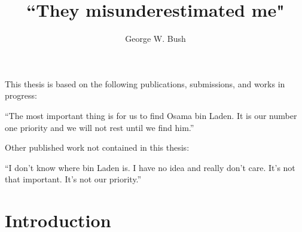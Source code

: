 \documentclass[12pt,twoside]{UoMthesis}
\title{``They misunderestimated me"}
\author{George W. Bush}
\begin{document}
\preface

This thesis is based on the following publications, submissions, and works in progress:
\begin{list}{}{}
\item ``The most important thing is for us to find Osama bin Laden. It is our number one priority and we will not rest until we find him.''
\end{list}

\noindent
Other published work not contained in this thesis:
\begin{list}{}{}
\item ``I don't know where bin Laden is. I have no idea and really don't care. It's not that important. It's not our priority.''
\end{list}
\newpage

\startthesis

\chapter{Introduction}\label{Ch:intro}
%






    
\end{document}
